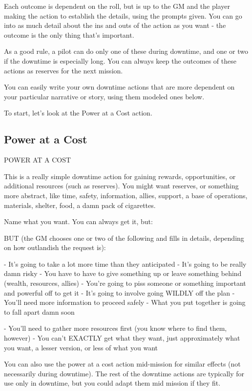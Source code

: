 Each outcome is dependent on the roll, but is up to the GM and the player making the action to
establish the details, using the prompts given. You can go into as much detail about the ins and
outs of the action as you want - the outcome is the only thing that’s important.

As a good rule, a pilot can do only one of these during downtime, and one or two if the downtime
is especially long. You can always keep the outcomes of these actions as reserves for the next
mission.

You can easily write your own downtime actions that are more dependent on your particular
narrative or story, using them modeled ones below.

To start, let’s look at the Power at a Cost action.

\subsection{Power at a Cost}
POWER AT A COST

This is a really simple downtime action for gaining rewards, opportunities, or additional
resources (such as reserves). You might want reserves, or something more abstract, like time,
safety, information, allies, support, a base of operations, materials, shelter, food, a damn
pack of cigarettes.


Name what you want. You can always get it, but:

BUT (the GM chooses one or two of the following and fills in details, depending on how
outlandish the request is):

    -    It’s going to take a lot more time than they anticipated
    -    It’s going to be really damn risky
    -    You have to have to give something up or leave something behind (wealth, resources,
         allies)
    -    You’re going to piss someone or something important and powerful off to get it
    -    It’s going to involve going WILDLY off the plan
    -    You’ll need more information to proceed safely
    -    What you put together is going to fall apart damn soon




    -    You’ll need to gather more resources first (you know where to find them, however)
    -    You can’t EXACTLY get what they want, just approximately what you want, a lesser
         version, or less of what you want


You can also use the power at a cost action mid-mission for similar effects (not necessarily
during downtime). The rest of the downtime actions are typically for use only in downtime, but
you could adapt them mid mission if they fit.


